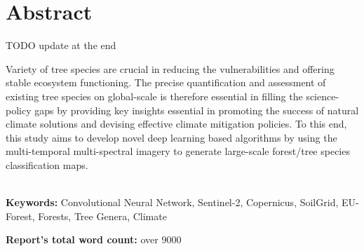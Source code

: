 \chapter*{\center \Large  Abstract}
TODO update at the end

Variety of tree species are crucial in reducing the vulnerabilities and offering stable ecosystem functioning. The precise quantification and assessment of existing tree species on global-scale is therefore essential in filling the science-policy gaps by providing key insights essential in promoting the success of natural climate solutions and devising effective climate mitigation policies. To this end, this study aims to develop novel deep learning based algorithms by using the multi-temporal multi-spectral imagery to generate large-scale forest/tree species classification maps.

~\\[1cm]
\noindent %
\textbf{Keywords:} Convolutional Neural Network, Sentinel-2, Copernicus, SoilGrid, EU-Forest, Forests, Tree Genera, Climate

\vfill
\noindent
\textbf{Report's total word count:} over 9000